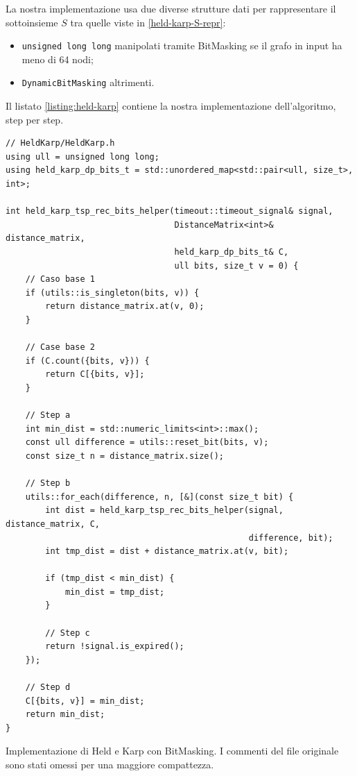 \noindent La nostra implementazione usa due diverse strutture dati per rappresentare il sottoinsieme $S$ tra quelle viste in \ref{held-karp-S-repr}:

\begin{itemize}
    \item \texttt{unsigned long long} manipolati tramite BitMasking se il grafo in input ha meno di 64 nodi;
    \item \texttt{DynamicBitMasking} altrimenti.
\end{itemize}

\noindent Il listato \ref{listing:held-karp} contiene la nostra implementazione dell'algoritmo, step per step.

\begin{listing}[!ht]
\begin{verbatim}
// HeldKarp/HeldKarp.h
using ull = unsigned long long;
using held_karp_dp_bits_t = std::unordered_map<std::pair<ull, size_t>, int>;

int held_karp_tsp_rec_bits_helper(timeout::timeout_signal& signal,
                                  DistanceMatrix<int>& distance_matrix,
                                  held_karp_dp_bits_t& C,
                                  ull bits, size_t v = 0) {
    // Caso base 1
    if (utils::is_singleton(bits, v)) {
        return distance_matrix.at(v, 0);
    }

    // Case base 2
    if (C.count({bits, v})) {
        return C[{bits, v}];
    }

    // Step a
    int min_dist = std::numeric_limits<int>::max();
    const ull difference = utils::reset_bit(bits, v);
    const size_t n = distance_matrix.size();

    // Step b
    utils::for_each(difference, n, [&](const size_t bit) {
        int dist = held_karp_tsp_rec_bits_helper(signal, distance_matrix, C,
                                                 difference, bit);
        int tmp_dist = dist + distance_matrix.at(v, bit);

        if (tmp_dist < min_dist) {
            min_dist = tmp_dist;
        }

        // Step c
        return !signal.is_expired();
    });

    // Step d
    C[{bits, v}] = min_dist;
    return min_dist;
}

\end{verbatim}
\caption{Implementazione di Held e Karp con BitMasking. I commenti del file originale sono stati omessi per una maggiore compattezza.}
\label{listing:held-karp}
\end{listing}

